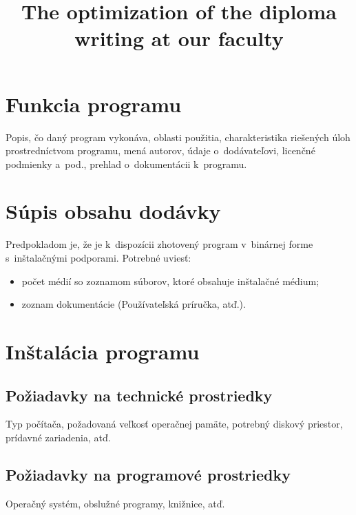 \documentclass[a4paper]{pouzivatelskaPrirucka}
\title{The optimization of the diploma writing at our faculty}
\begin{document}
\titulnastrana
\newpage
\tableofcontents
\newpage
\setcounter{page}{1}
\listoffigures
\newpage
{}
\listoftables

\newpage\section{Funkcia programu}

Popis, čo daný program vykonáva, oblasti použitia, charakteristika riešených úloh prostredníctvom programu, mená autorov, údaje o~dodávateľovi, licenčné podmienky a~pod., prehlad o~dokumentácii k~programu. 

\newpage\section{Súpis obsahu dodávky}

Predpokladom je, že je k~dispozícii zhotovený program v~binárnej forme s~inštalačnými podporami. Potrebné  uviesť:
\begin{itemize}
\item počet médií so zoznamom súborov, ktoré obsahuje inštalačné médium;
\item zoznam dokumentácie (Používateľská príručka, atď.).
\end{itemize}

\newpage\section{Inštalácia programu}

\subsection{Požiadavky na technické prostriedky}

Typ počítača, požadovaná veľkosť operačnej pamäte, potrebný diskový priestor, prídavné zariadenia, atď.

\subsection{Požiadavky na programové prostriedky}
Operačný systém, obslužné programy, knižnice, atď.
\end{document}
